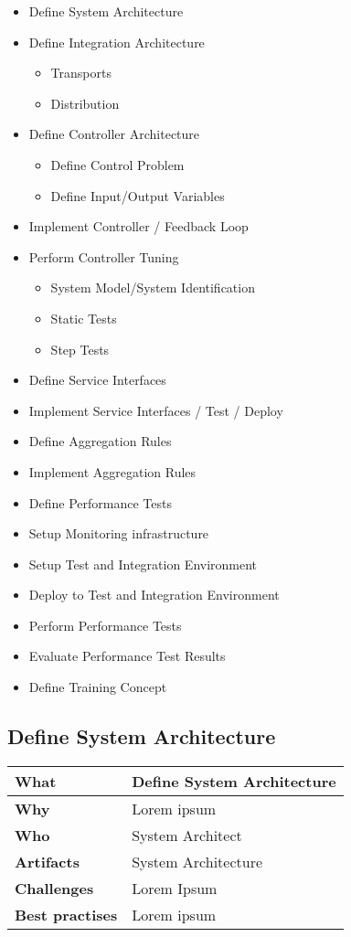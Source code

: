 \begin{itemize}
	\item Define System Architecture 
	\item Define Integration Architecture
	\begin{itemize}
		\item Transports
		\item Distribution
	\end{itemize}
	\item Define Controller Architecture 
	\begin{itemize}
		\item Define Control Problem 
		\item Define Input/Output Variables 
	\end{itemize}
	\item Implement Controller / Feedback Loop
	\item Perform Controller Tuning 
	\begin{itemize}
		\item System Model/System Identification 
		\item Static Tests
		\item Step Tests
	\end{itemize}
	\item Define Service Interfaces
	\item Implement Service Interfaces / Test / Deploy
	\item Define Aggregation Rules
	\item Implement Aggregation Rules 
	\item Define Performance Tests 
	\item Setup Monitoring infrastructure
	\item Setup Test and Integration Environment
	\item Deploy to Test and Integration Environment
	\item Perform Performance Tests
	\item Evaluate Performance Test Results
	\item Define Training Concept
\end{itemize}

\subsection{Define System Architecture }
 \label{table:ch6_Task_Define_System_Architect}
\begin{tabular}
	{|m{3cm}|m{10cm}|} \hline \bfseries What & Define System Architecture\\
	\hline \bfseries Why & Lorem ipsum\\
	\hline \bfseries Who & System Architect\\
	\hline \bfseries Artifacts & System Architecture\\
	\hline \bfseries Challenges & Lorem Ipsum\\
	\hline \bfseries Best practises & Lorem ipsum\\
	\hline 
\end{tabular}

